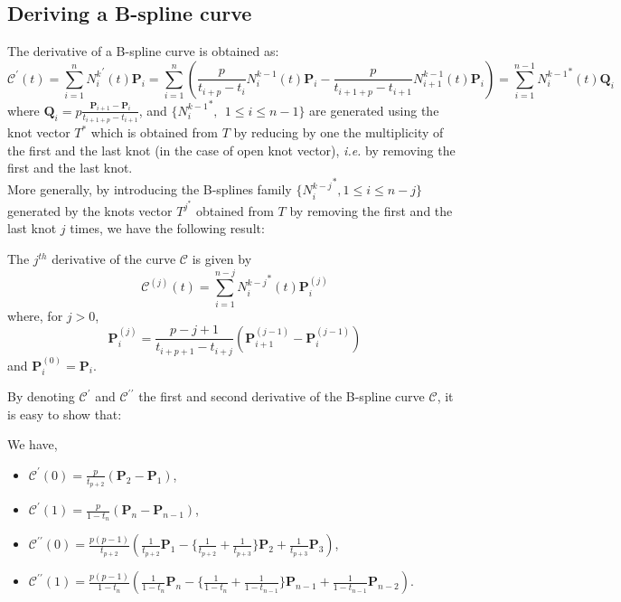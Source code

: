 \subsection{Deriving a B-spline curve} 
\label{subDerivCurve}
The derivative of a B-spline curve is obtained as:
\begin{equation}
\mathcal{C}^{\prime}(t) = \sum_{i=1}^{n} {N_{i}^{k}}^{\prime}(t) \mathbf{P}_i = \sum_{i=1}^{n} \left(\frac{p}{t_{i+p}-t_{i}}N_{i}^{k-1}(t) \mathbf{P}_i - \frac{p}{t_{i+1+p}-t_{i+1}}N_{i+1}^{k-1}(t) \mathbf{P}_i \right)
= \sum_{i=1}^{n-1} {N_{i}^{k-1}}^{\ast}(t) \mathbf{Q}_i
\end{equation}
where $\mathbf{Q}_i = p \frac{\mathbf{P}_{i+1} - \mathbf{P}_i}{t_{i+1+p}-t_{i+1}}$, and $\{{N_{i}^{k-1}}^{\ast},~~1 \leq i \leq n-1\}$ are generated using the knot vector $T^{\ast}$ %
which is obtained from $T$ by reducing by one the multiplicity of the first and the last knot (in the case of open knot vector), \textit{i.e.} by removing the first and the last knot.
\\
More generally, by introducing the B-splines family $\{ {N_{i}^{k-j}}^{\ast}, 1 \leq i \leq n-j \}$ generated by the knots vector $T^{j^{\ast}}$ obtained from $T$ by removing the first and the last knot $j$ times, we have the following result:
\begin{proposition} The $j^{th}$ derivative of the curve $\mathcal{C}$ is given by
$$
\mathcal{C}^{(j)}(t) = \sum_{i=1}^{n-j} {N_{i}^{k-j}}^{\ast}(t) \mathbf{P}_i^{(j)}
$$
where, for $j>0$,
$$
\mathbf{P}_i^{(j)} = \frac{p-j+1}{t_{i+p+1}-t_{i+j}} \left( \mathbf{P}_{i+1}^{(j-1)} - \mathbf{P}_i^{(j-1)} \right)
$$
and $\mathbf{P}_i^{(0)} = \mathbf{P}_i$.
\end{proposition}
By denoting $\mathcal{C}^{\prime}$ and $\mathcal{C}^{\prime\prime}$ the first and second derivative of the B-spline curve $\mathcal{C}$, it is easy to show that:
\begin{proposition}
We have,
\begin{itemize}
 \item $\mathcal{C}^{\prime}(0) = \frac{p}{t_{p+2}} \left(\mathbf{P}_{2} - \mathbf{P}_1\right)$,
 \item $\mathcal{C}^{\prime}(1) = \frac{p}{1-t_{n}} \left(\mathbf{P}_{n} - \mathbf{P}_{n-1}\right)$,
 \item $\mathcal{C}^{\prime\prime}(0) = \frac{p(p-1)}{t_{p+2}} \left( \frac{1}{t_{p+2}}\mathbf{P}_{1} 
- \{ \frac{1}{t_{p+2}} + \frac{1}{t_{p+3}} \} \mathbf{P}_2 + \frac{1}{t_{p+3}}\mathbf{P}_{3} \right)$,
 \item $\mathcal{C}^{\prime\prime}(1) = \frac{p(p-1)}{1-t_{n}} \left( \frac{1}{1-t_{n}}\mathbf{P}_{n} 
- \{ \frac{1}{1-t_{n}} + \frac{1}{1-t_{n-1}} \} \mathbf{P}_{n-1} + \frac{1}{1-t_{n-1}}\mathbf{P}_{n-2} \right)$.
\end{itemize}
\end{proposition}
